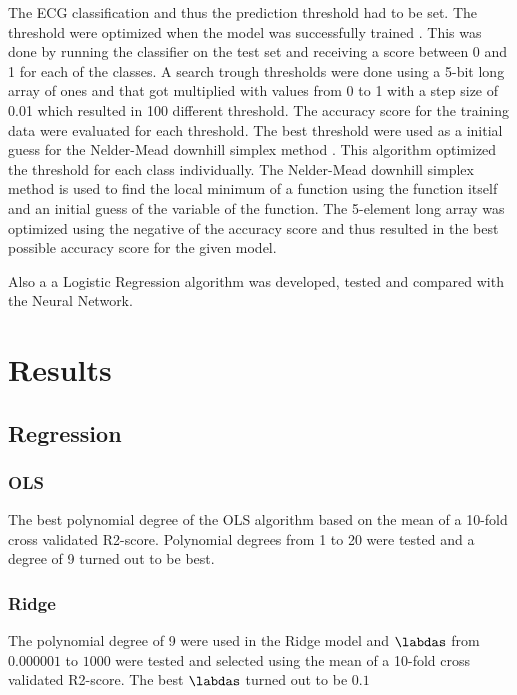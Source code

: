 \documentclass[twocolumn]{cinc}
\begin{document}
The ECG classification and thus the prediction threshold had to be set. The threshold  were optimized when the model was successfully trained . This was done by running the classifier on the test set  and receiving a score between 0 and 1 for each of the classes. A search trough thresholds were done using a 5-bit long array of ones and that got multiplied with values from 0 to 1 with a step size of 0.01 which resulted in 100 different threshold. The accuracy score for the training data were evaluated for each threshold. The best threshold were used as a initial guess for the Nelder-Mead downhill simplex method \cite{nelder_simplex_1965, virtanen_scipy_2020}. This algorithm optimized the threshold for each class individually. The Nelder-Mead downhill simplex method is used to find the local minimum of a function using the function itself and an initial guess of the variable of the function. The 5-element long array was optimized using the negative of the accuracy score and thus resulted in the best possible accuracy score for the given model.

Also a a Logistic Regression algorithm was developed, tested and compared with the Neural Network.


\section{Results}
\subsection{Regression}
\subsubsection{OLS}
The best polynomial degree of the OLS algorithm based on the mean of a 10-fold cross validated R2-score. Polynomial degrees from 1 to 20 were tested and a degree of 9 turned out to be best.
\subsubsection{Ridge}
The polynomial degree of 9 were used in the Ridge model and $\labdas$ from $0.000001$ to $1000$ were tested and selected using the mean of a 10-fold cross validated R2-score. The best $\labdas$ turned out to be $0.1$
\end{document}
